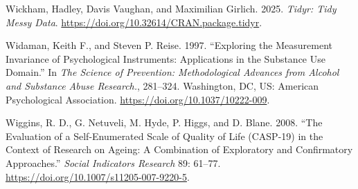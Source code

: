 \documentclass[
  man,
  floatsintext]{apa7}
\newlength{\cslhangindent}
\newenvironment{CSLReferences}[2] %
 {\begin{list}{}{%
  \setlength{\itemindent}{0pt}
  \setlength{\leftmargin}{0pt}
  \setlength{\parsep}{0pt}
  \ifodd #1
   \setlength{\leftmargin}{\cslhangindent}
   \setlength{\itemindent}{-1\cslhangindent}
  \fi
  \setlength{\itemsep}{#2\baselineskip}}}
 {\end{list}}
\begin{document}
\begin{CSLReferences}{1}{0}
Wickham, Hadley, Davis Vaughan, and Maximilian Girlich. 2025.
\emph{Tidyr: Tidy Messy Data}.
\url{https://doi.org/10.32614/CRAN.package.tidyr}.

Widaman, Keith F., and Steven P. Reise. 1997. {``Exploring the
Measurement Invariance of Psychological Instruments: {Applications} in
the Substance Use Domain.''} In \emph{The Science of Prevention:
{Methodological} Advances from Alcohol and Substance Abuse Research.},
281--324. Washington, DC, US: American Psychological Association.
\url{https://doi.org/10.1037/10222-009}.

Wiggins, R. D., G. Netuveli, M. Hyde, P. Higgs, and D. Blane. 2008.
{``{The Evaluation of a Self-Enumerated Scale of Quality of Life
(CASP-19) in the Context of Research on Ageing: A Combination of
Exploratory and Confirmatory Approaches}.''} \emph{Social Indicators
Research} 89: 61--77. \url{https://doi.org/10.1007/s11205-007-9220-5}.

\end{CSLReferences}
\end{document}
